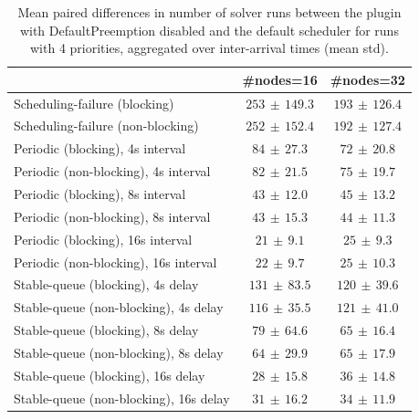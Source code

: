\begin{table}[t]
\tiny
\setlength{\tabcolsep}{1.2pt}
\renewcommand{\arraystretch}{1.12}
\centering
\caption{Mean paired differences in number of solver runs between the plugin with DefaultPreemption disabled and the default scheduler for runs with 4 priorities, aggregated over inter-arrival times (mean \pm std).}
\label{tab:solver_runs-defpreempt0-prio4-std1-agg-arrival}
\begin{tabular}{l c c}
\toprule
 & \#nodes=16 & \#nodes=32 \\
\midrule
Scheduling-failure (blocking) & $253\,\pm\,149.3$ & $193\,\pm\,126.4$ \\
Scheduling-failure (non-blocking) & $252\,\pm\,152.4$ & $192\,\pm\,127.4$ \\
Periodic (blocking), 4s interval & $84\,\pm\,27.3$ & $72\,\pm\,20.8$ \\
Periodic (non-blocking), 4s interval & $82\,\pm\,21.5$ & $75\,\pm\,19.7$ \\
Periodic (blocking), 8s interval & $43\,\pm\,12.0$ & $45\,\pm\,13.2$ \\
Periodic (non-blocking), 8s interval & $43\,\pm\,15.3$ & $44\,\pm\,11.3$ \\
Periodic (blocking), 16s interval & $21\,\pm\,9.1$ & $25\,\pm\,9.3$ \\
Periodic (non-blocking), 16s interval & $22\,\pm\,9.7$ & $25\,\pm\,10.3$ \\
Stable-queue (blocking), 4s delay & $131\,\pm\,83.5$ & $120\,\pm\,39.6$ \\
Stable-queue (non-blocking), 4s delay & $116\,\pm\,35.5$ & $121\,\pm\,41.0$ \\
Stable-queue (blocking), 8s delay & $79\,\pm\,64.6$ & $65\,\pm\,16.4$ \\
Stable-queue (non-blocking), 8s delay & $64\,\pm\,29.9$ & $65\,\pm\,17.9$ \\
Stable-queue (blocking), 16s delay & $28\,\pm\,15.8$ & $36\,\pm\,14.8$ \\
Stable-queue (non-blocking), 16s delay & $31\,\pm\,16.2$ & $34\,\pm\,11.9$ \\
\bottomrule
\end{tabular}
\end{table}

